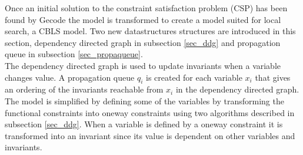 Once an initial solution to the constraint satisfaction problem (CSP) has been found by Gecode the model is transformed 
to create a model suited for local search, a CBLS model. Two new datastructures structures are introduced in this 
section, dependency directed graph in subsection \ref{sec_ddg} and propagation queue in subsection \ref{sec_propaqueue}. 
\\
The dependency directed graph is used to update invariants when a variable changes value. A 
propagation queue $q_i$ is created for each variable $x_i$ that gives an ordering of the invariants reachable from 
$x_i$ in the dependency directed graph. \\

The model is simplified by defining some of the variables by transforming the functional constraints into oneway 
constraints using two algorithms described in subsection \ref{sec_ddg}. When a variable is defined by a oneway 
constraint it is transformed into an invariant since its value is dependent on other variables and invariants. 
